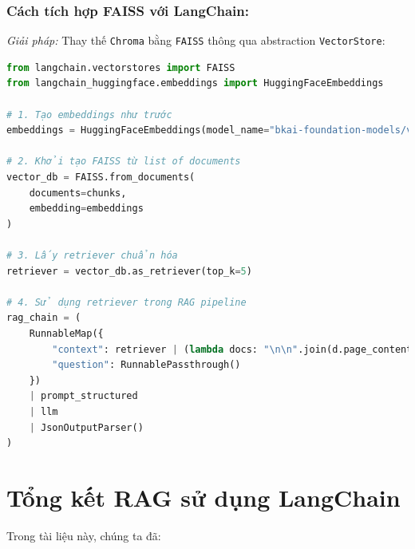 \documentclass[11pt]{article}
\begin{document}
\subsubsection*{Cách tích hợp FAISS với LangChain:}

\noindent \textit{Giải pháp:} Thay thế \texttt{Chroma} bằng \texttt{FAISS} thông qua abstraction \texttt{VectorStore}:

\begin{lstlisting}[language=Python, caption=Tích hợp FAISS với LangChain]
from langchain.vectorstores import FAISS
from langchain_huggingface.embeddings import HuggingFaceEmbeddings

# 1. Tạo embeddings như trước
embeddings = HuggingFaceEmbeddings(model_name="bkai-foundation-models/vietnamese-bi-encoder")

# 2. Khởi tạo FAISS từ list of documents
vector_db = FAISS.from_documents(
    documents=chunks,
    embedding=embeddings
)

# 3. Lấy retriever chuẩn hóa
retriever = vector_db.as_retriever(top_k=5)

# 4. Sử dụng retriever trong RAG pipeline
rag_chain = (
    RunnableMap({
        "context": retriever | (lambda docs: "\n\n".join(d.page_content for d in docs)),
        "question": RunnablePassthrough()
    })
    | prompt_structured
    | llm
    | JsonOutputParser()
)
\end{lstlisting}


\section{Tổng kết RAG sử dụng LangChain}

Trong tài liệu này, chúng ta đã:
\end{document}
